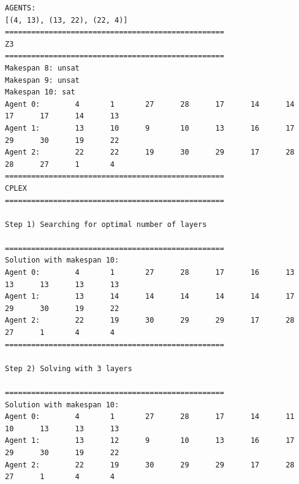 \documentclass[12pt, a4paper, hidelinks]{article}
\numberwithin{equation}{section}
\begin{document}
\begin{lstlisting}[label={lst:warehouse}]
AGENTS:
[(4, 13), (13, 22), (22, 4)]
==================================================
Z3
==================================================
Makespan 8: unsat
Makespan 9: unsat
Makespan 10: sat
Agent 0:        4       1       27      28      17      14      14      17      17      14      13
Agent 1:        13      10      9       10      13      16      17      29      30      19      22
Agent 2:        22      22      19      30      29      17      28      28      27      1       4
==================================================
CPLEX
==================================================

Step 1) Searching for optimal number of layers

==================================================
Solution with makespan 10:
Agent 0:        4       1       27      28      17      16      13      13      13      13      13
Agent 1:        13      14      14      14      14      14      17      29      30      19      22
Agent 2:        22      19      30      29      29      17      28      27      1       4       4
==================================================

Step 2) Solving with 3 layers

==================================================
Solution with makespan 10:
Agent 0:        4       1       27      28      17      14      11      10      13      13      13
Agent 1:        13      12      9       10      13      16      17      29      30      19      22
Agent 2:        22      19      30      29      29      17      28      27      1       4       4
\end{lstlisting}~\nocite{*}


\end{document}

